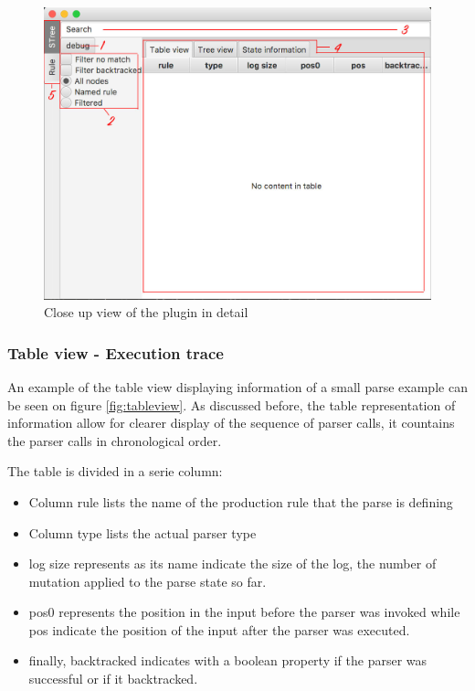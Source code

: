	\begin{figure}[t]
		\includegraphics[width=1\textwidth] {ressources/stand_alone_detailed}
		\caption{Close up view of the plugin in detail} 
		\label{fig:stand_alone_detailed}
	\end{figure}

	\subsubsection{Table view - Execution trace} An example of the table view displaying information of a small parse example can be seen on figure \ref{fig:tableview}. As discussed before, the table representation of information allow for clearer display of the sequence of parser calls, it countains the parser calls in chronological order.

	\bigskip

	The table is divided in a serie column:
	\begin{itemize}
		\item Column rule lists the name of the production rule that the parse is defining
		\item Column type lists the actual parser type
		\item log size represents as its name indicate the size of the log, the number of mutation applied to the parse state so far.
		\item pos0 represents the position in the input before the parser was invoked while pos indicate the position of the input after the parser was executed.
		\item finally, backtracked indicates with a boolean property if the parser was successful or if it backtracked. 
	\end{itemize}


